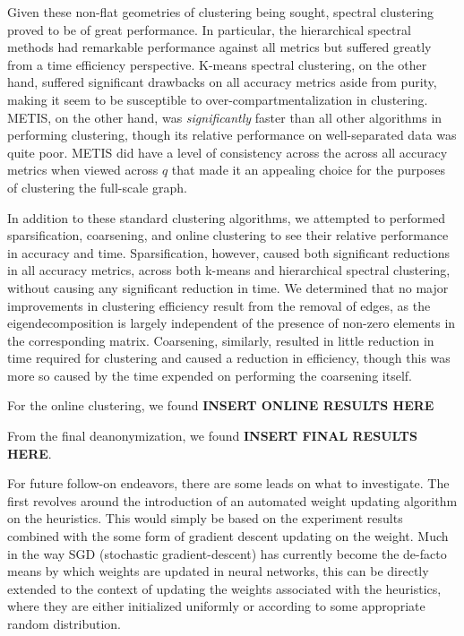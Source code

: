 \documentclass{article}
\begin{document}
Given these non-flat geometries of clustering being sought, spectral clustering proved to be of great performance. In particular, the hierarchical spectral methods had remarkable performance against all metrics but suffered greatly from a time efficiency perspective. K-means spectral clustering, on the other hand, suffered significant drawbacks on all accuracy metrics aside from purity, making it seem to be susceptible to over-compartmentalization in clustering. METIS, on the other hand, was \textit{significantly} faster than all other algorithms in performing clustering, though its relative performance on well-separated data was quite poor. METIS did have a level of consistency across the across all accuracy metrics when viewed across $q$ that made it an appealing choice for the purposes of clustering the full-scale graph.

In addition to these standard clustering algorithms, we attempted to performed sparsification, coarsening, and online clustering to see their relative performance in accuracy and time. Sparsification, however, caused both significant reductions in all accuracy metrics, across both k-means and hierarchical spectral clustering, without causing any significant reduction in time. We determined that no major improvements in clustering efficiency result from the removal of edges, as the eigendecomposition is largely independent of the presence of non-zero elements in the corresponding matrix. Coarsening, similarly, resulted in little reduction in time required for clustering and caused a reduction in efficiency, though this was more so caused by the time expended on performing the coarsening itself.

For the online clustering, we found \textbf{INSERT ONLINE RESULTS HERE}

From the final deanonymization, we found \textbf{INSERT FINAL RESULTS HERE}.

For future follow-on endeavors, there are some leads on what to investigate. The first revolves around the introduction of an automated weight updating algorithm on the heuristics. This would simply be based on the experiment results combined with the some form of gradient descent updating on the weight. Much in the way SGD (stochastic gradient-descent) has currently become the de-facto means by which weights are updated in neural networks, this can be directly extended to the context of updating the weights associated with the heuristics, where they are either initialized uniformly or according to some appropriate random distribution.
\end{document}
